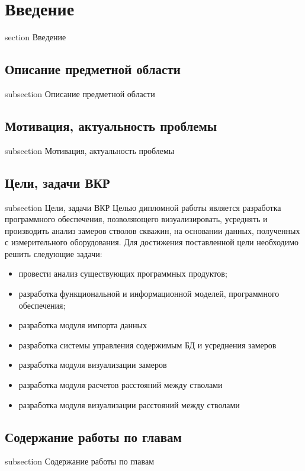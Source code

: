 \newpage
\section*{Введение}
 {section} {Введение}
\subsection*{Описание предметной области}
 {subsection} {Описание предметной области}

\subsection*{Мотивация, актуальность проблемы}
 {subsection} {Мотивация, актуальность проблемы}

\subsection*{Цели, задачи ВКР}
 {subsection} {Цели, задачи ВКР}
Целью дипломной работы является разработка программного обеспечения, позволяющего визуализировать, усреднять и производить анализ замеров стволов скважин,
на основании данных, полученных с измерительного оборудования. Для достижения поставленной цели необходимо решить следующие задачи:
\begin{itemize}
  \item провести анализ существующих программных продуктов;
  \item разработка функциональной и информационной моделей, программного обеспечения;
  \item разработка модуля импорта данных
  \item разработка системы управления содержимым БД и усреднения замеров
  \item разработка модуля визуализации замеров
  \item разработка модуля расчетов расстояний между стволами
  \item разработка модуля визуализации расстояний между стволами
\end{itemize}

\subsection*{Содержание работы по главам}
 {subsection} {Содержание работы по главам}
